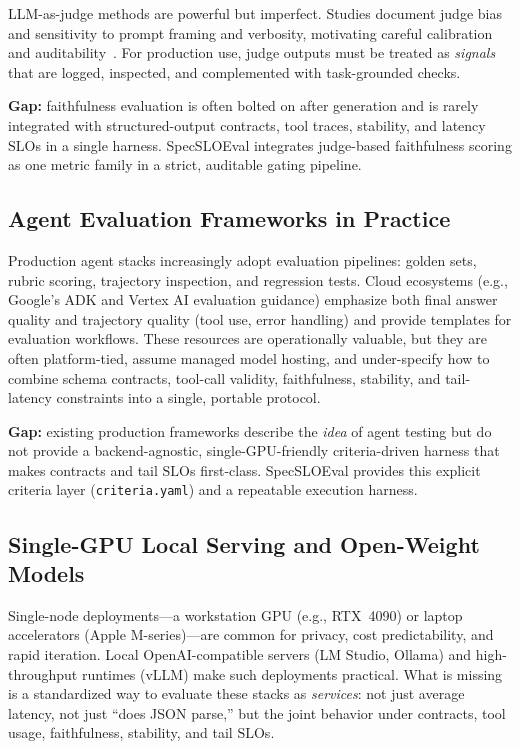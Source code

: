 \documentclass[11pt]{article}
\newcommand{\slo}{\ensuremath{\mathrm{SLO}}}
\begin{document}
LLM-as-judge methods are powerful but imperfect.
Studies document judge bias and sensitivity to prompt framing and verbosity, motivating careful calibration and auditability~\citep{llmjudgebias}.
For production use, judge outputs must be treated as \emph{signals} that are logged, inspected, and complemented with task-grounded checks.

\textbf{Gap:} faithfulness evaluation is often bolted on after generation and is rarely integrated with structured-output contracts, tool traces, stability, and latency \slo s in a single harness.
SpecSLOEval integrates judge-based faithfulness scoring as one metric family in a strict, auditable gating pipeline.

\subsection{Agent Evaluation Frameworks in Practice}

Production agent stacks increasingly adopt evaluation pipelines: golden sets, rubric scoring, trajectory inspection, and regression tests.
Cloud ecosystems (e.g., Google’s ADK and Vertex AI evaluation guidance) emphasize both final answer quality and trajectory quality (tool use, error handling) and provide templates for evaluation workflows.
These resources are operationally valuable, but they are often platform-tied, assume managed model hosting, and under-specify how to combine schema contracts, tool-call validity, faithfulness, stability, and tail-latency constraints into a single, portable protocol.

\textbf{Gap:} existing production frameworks describe the \emph{idea} of agent testing but do not provide a backend-agnostic, single-GPU-friendly criteria-driven harness that makes contracts and tail \slo s first-class.
SpecSLOEval provides this explicit criteria layer (\texttt{criteria.yaml}) and a repeatable execution harness.

\subsection{Single-GPU Local Serving and Open-Weight Models}

Single-node deployments---a workstation GPU (e.g., RTX~4090) or laptop accelerators (Apple M-series)---are common for privacy, cost predictability, and rapid iteration.
Local OpenAI-compatible servers (LM Studio, Ollama) and high-throughput runtimes (vLLM) make such deployments practical.
What is missing is a standardized way to evaluate these stacks as \emph{services}: not just average latency, not just “does JSON parse,” but the joint behavior under contracts, tool usage, faithfulness, stability, and tail \slo s.
\end{document}

